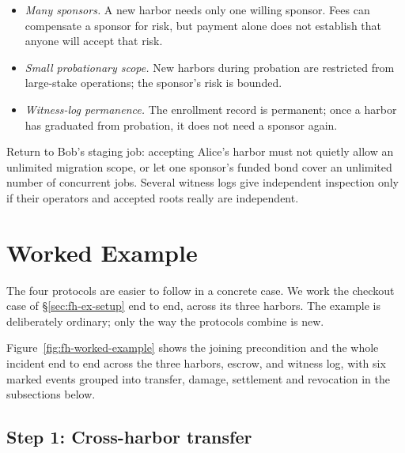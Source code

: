 \documentclass[11pt,a4paper]{article}
\theoremstyle{definition}
\theoremstyle{remark}
\begin{document}
\begin{itemize}[nosep]
\item \emph{Many sponsors.} A new harbor needs only one willing sponsor. Fees can compensate a sponsor for risk, but payment alone does not establish that anyone will accept that risk.
\item \emph{Small probationary scope.} New harbors during probation are restricted from large-stake operations; the sponsor's risk is bounded.
\item \emph{Witness-log permanence.} The enrollment record is permanent; once a harbor has graduated from probation, it does not need a sponsor again.
\end{itemize}

Return to
Bob's staging job: accepting Alice's harbor must not quietly allow an unlimited
migration scope, or let one sponsor's funded bond cover an unlimited number
of concurrent jobs. Several witness logs give independent inspection only if their operators and accepted roots really are independent.

\section{Worked Example}\label{sec:fh-worked-example}

The four protocols are easier to follow in a concrete case. We work the checkout case of \S\ref{sec:fh-ex-setup} end to end, across its three harbors. The example is deliberately ordinary; only the way the protocols combine is new.

Figure~\ref{fig:fh-worked-example} shows the joining precondition and the
whole incident end to end across the three harbors, escrow, and witness log,
with six marked events grouped into transfer, damage, settlement and revocation
in the subsections below.



\subsection{Step 1: Cross-harbor transfer}\label{sec:fh-ex-xfer}
\end{document}
